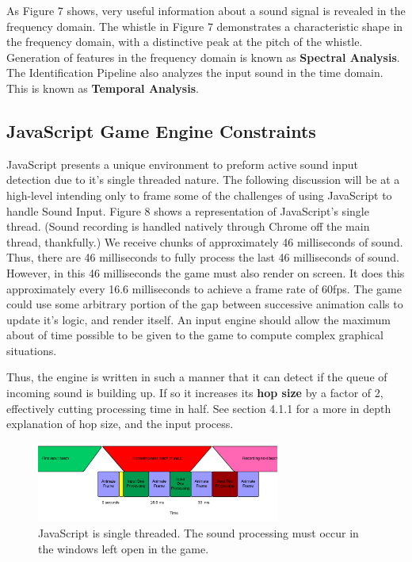 \documentclass[DIV=calc, paper=a4, fontsize=11pt, twocolumn]{scrartcl}   %
\begin{document}
  \par As Figure 7 shows, very useful information about a sound signal is revealed in the frequency domain. The whistle in Figure 7 demonstrates a characteristic shape in the frequency domain, with a distinctive peak at the pitch of the whistle. Generation of features in the frequency domain is known as \textbf{Spectral Analysis}. The Identification Pipeline also analyzes the input sound in the time domain. This is known as \textbf{Temporal Analysis}.

\subsection{JavaScript Game Engine Constraints}
JavaScript presents a unique environment to preform active sound input detection due to it's single threaded nature. The following discussion will be at a high-level intending only to frame some of the challenges of using JavaScript to handle Sound Input. Figure 8 shows a representation of JavaScript's single thread. (Sound recording is handled natively through Chrome off the main thread, thankfully.) We receive chunks of approximately 46 milliseconds of sound. Thus, there are 46 milliseconds to fully process the last 46 milliseconds of sound. However, in this 46 milliseconds the game must also render on screen. It does this approximately every 16.6 milliseconds to achieve a frame rate of 60fps. The game could use some arbitrary portion of the gap between successive animation calls to update it's logic, and render itself. An input engine should allow the maximum about of time possible to be given to the game to compute complex graphical situations.
\par Thus, the engine is written in such a manner that it can detect if the queue of incoming sound is building up. If so it increases its \textbf{hop size} by a factor of 2, effectively cutting processing time in half. See section 4.1.1 for a more in depth explanation of hop size, and the input process.
\begin{figure}[h]
\centering
\includegraphics[width=80mm]{figures/JavascriptEventLoop.png}
\caption{JavaScript is single threaded. The sound processing must occur in the windows left open in the game.}
\label{overflow}
\end{figure}
\end{document}
